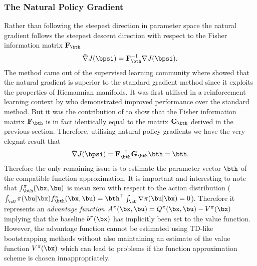 \subsubsection{The Natural Policy Gradient}
Rather than following the steepest direction in parameter space the natural gradient follows the steepest descent direction with respect to the Fisher information matrix $\mathbf{F}_{\bth}$
\begin{equation}
\tilde\nabla  J(\bpsi) = \mathbf{F}_{\bth}^{-1} \nabla  J(\bpsi).
\end{equation}
The method came out of the supervised learning community where \cite{Ama98} showed that the natural gradient is superior to the standard gradient method since it exploits the properties of Riemannian manifolds. It was first utilised in a reinforcement learning context by \cite{Kak02} who demonstrated improved performance over the standard method. But it was the contribution of \cite{PVS05} to show that the Fisher information matrix $\mathbf{F}_{\bth}$ is in fact identically equal to the matrix $\mathbf{G}_{\bth}$ derived in the previous section. Therefore, utilising natural policy gradients we have the very elegant result that
\begin{equation}
\tilde\nabla J(\bpsi) = \mathbf{F}_{\bth}^{-1} \mathbf{G}_{\bth} \bth = \bth.
\end{equation}
Therefore the only remaining issue is to estimate the parameter vector $\bth$ of the compatible function approximation.
It is important and interesting to note that $f^\pi_{\bth}(\bx,\bu)$ is mean zero with respect to the action distribution ($\int_{\cU} \pi(\bu|\bx) f^\pi_{\bth}(\bx,\bu) = \bth^\top \int_{\cU} \nabla\pi(\bu|\bx) =0$). Therefore it represents an \textit{advantage function} $A^\pi(\bx,\bu) = Q^\pi(\bx,\bu) - V^\pi(\bx)$ implying that the baseline $b^\pi(\bx)$ has implicitly been set to the value function. However, the advantage function cannot be estimated using TD-like bootstrapping methods without also maintaining an estimate of the value function $V^\pi(\bx)$ which can lead to problems if the function approximation scheme is chosen innappropriately.

